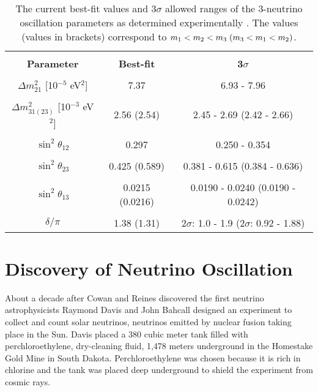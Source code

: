 \begin{table}
	\centering
\begin{tabular}{ccc}
	\hline
	\vspace{-0.3cm} \\ 
	\textbf{Parameter} & \textbf{Best-fit} & \textbf{3$\sigma$} \vspace{0.1cm} \\ 
	\hline 
	\vspace{-0.3cm} \\
	$\Delta m^2_{21}$ [10$^{-5}$ eV$^2$] & 7.37 & 6.93 - 7.96 \\ 
	\vspace{-0.3cm} \\
	$\Delta m^2_{31(23)}$ [10$^{-3}$ eV$^2$] & 2.56 (2.54) & 2.45 - 2.69 (2.42 - 2.66) \\ 
	\vspace{-0.3cm} \\
	$\sin^2\theta_{12}$  & 0.297 & 0.250 - 0.354 \\ 
	\vspace{-0.3cm} \\
	$\sin^2\theta_{23}$  & 0.425 (0.589) & 0.381 - 0.615 (0.384 - 0.636) \\ 
	\vspace{-0.3cm} \\
	$\sin^2\theta_{13}$  & 0.0215 (0.0216) & 0.0190 - 0.0240 (0.0190 - 0.0242) \\ 
	\vspace{-0.3cm} \\
	$\delta/\pi$ & 1.38 (1.31) & 2$\sigma$: 1.0 - 1.9 (2$\sigma$: 0.92 - 1.88) \\ 
	\hline 
\end{tabular} 
\caption{The current best-fit values and 3$\sigma$ allowed ranges of the 3-neutrino oscillation parameters as determined experimentally \cite{PDG}. The values (values in brackets) correspond to $m_1 < m_2 < m_3 \hspace{0.1cm} (m_3 < m_1 < m_2)$.}
\label{tab:ParamValues}
\end{table}


\section{Discovery of Neutrino Oscillation} \label{sec:NeutrinoOsc}

About a decade after Cowan and Reines discovered the first neutrino astrophysicists Raymond Davis and John Bahcall designed an experiment to collect and count solar neutrinos, neutrinos emitted by nuclear fusion taking place in the Sun. 
Davis placed a 380 cubic meter tank filled with perchloroethylene, dry-cleaning fluid, 1,478 meters underground in the Homestake Gold Mine in South Dakota. 
Perchloroethylene was chosen because it is rich in chlorine and the tank was placed deep underground to shield the experiment from cosmic rays. 

